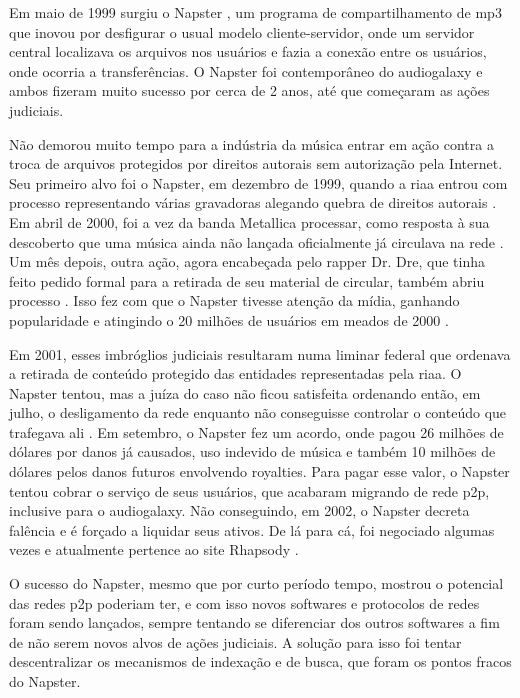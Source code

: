 Em maio de 1999 surgiu o Napster \cite{wiki:napster}, um programa de
compartilhamento de \gls*{mp3} que inovou por desfigurar o usual modelo
cliente-servidor, onde um servidor central localizava os arquivos nos usuários e fazia
a conexão entre os usuários, onde ocorria a transferências. O Napster foi contemporâneo
do \gls*{audiogalaxy} e ambos fizeram muito sucesso por cerca de 2 anos, até que
começaram as ações judiciais.

Não demorou muito tempo para a indústria da música entrar em ação contra a troca de
arquivos protegidos por direitos autorais sem autorização pela Internet. Seu primeiro
alvo foi o Napster, em dezembro de 1999, quando a \gls{riaa} entrou com processo
representando várias gravadoras alegando quebra de direitos autorais
\cite{site:napster-riaa}. Em abril de 2000, foi a vez da banda Metallica processar,
como resposta à sua descoberto que uma música ainda não lançada oficialmente já
circulava na rede \cite{site:napster-metallica,site:napster-metallica-orig}. Um mês
depois, outra ação, agora encabeçada pelo rapper Dr. Dre, que tinha feito pedido formal
para a retirada de seu material de circular, também abriu processo
\cite{site:napster-drdre-orig}. Isso fez com que o Napster tivesse atenção da mídia,
ganhando popularidade e atingindo o 20 milhões de usuários em meados de 2000
\cite{site:napster-use-2000}.

Em 2001, esses imbróglios judiciais resultaram numa liminar federal que ordenava a
retirada de conteúdo protegido das entidades representadas pela \gls*{riaa}. O Napster
tentou, mas a juíza do caso não ficou satisfeita ordenando então, em julho, o
desligamento da rede enquanto não conseguisse controlar o conteúdo que trafegava ali
\cite{wiki:napster}. Em setembro, o Napster fez um acordo, onde pagou 26 milhões de
dólares por danos já causados, uso indevido de música e também 10 milhões de dólares
pelos danos futuros envolvendo royalties. Para pagar esse valor, o Napster tentou cobrar
o serviço de seus usuários, que acabaram migrando de rede \gls*{p2p}, inclusive para o
\gls*{audiogalaxy}. Não conseguindo, em 2002, o Napster decreta falência e é forçado a
liquidar seus ativos. De lá para cá, foi negociado algumas vezes e atualmente pertence
ao site Rhapsody \cite{site:napster-rhapsody}.

O sucesso do Napster, mesmo que por curto período tempo, mostrou o potencial das redes
\gls*{p2p} poderiam ter, e com isso novos softwares e protocolos de redes foram sendo
lançados, sempre tentando se diferenciar dos outros softwares a fim de não serem novos
alvos de ações judiciais. A solução para isso foi tentar descentralizar os mecanismos de
indexação e de busca, que foram os pontos fracos do Napster.

